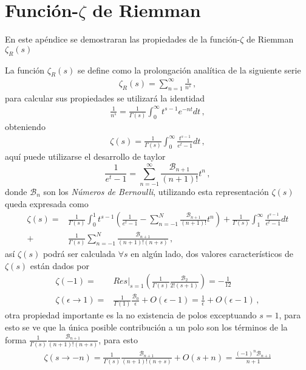 \chapter{Función-$\zeta$ de Riemman}\label{Apendice.2}

En este apéndice se demostraran las propiedades de la función-$\zeta$ de Riemman $\zeta _R (s)$

La función $\zeta _R (s)$ se define como la prolongación analítica de la siguiente serie
\begin{align}
	\zeta _R (s) = 
	\sum _{n=1} ^{\infty} \frac{1}{n ^{s}}
	\, ,
\end{align}
para calcular sus propiedades se utilizará la identidad
\begin{align}
	\frac{1}{n ^{s}} =
	\frac{1}{\Gamma (s)} 
	\int _0 ^{\infty} t^{s-1} e ^{-n t}  dt
	\, ,
\end{align}
obteniendo
\begin{align}
	\zeta (s) = 
	\frac{1}{\Gamma (s)}
	\int _0 ^\infty
	\frac{t ^{s-1}}{e ^t -1} dt
	\, ,
\end{align}
aquí puede utilizarse el desarrollo de taylor 
\begin{equation}
	\frac{1}{e ^t -1} = 
	\sum _{n=-1} ^{\infty}
	\frac{ \mathcal{B} _{n+1}}{(n+1)!} t ^n
	\, ,
\end{equation}
donde $\mathcal{B} _{n}$ son los {\it Números de Bernoulli}, utilizando esta representación $\zeta (s)$ queda expresada como
\begin{align}
	\zeta (s) = 
&
	\frac{1}{\Gamma (s)}
	\int _0 ^1 
	t ^{s-1} 
	\left(	
		\frac{1}{e ^t -1} -
		\sum _{n=-1} ^{N}
		\frac{ \mathcal{B} _{n+1}}{(n+1)!} t ^n	
		\right)		
		+
	\frac{1}{\Gamma (s)}
	\int _1 ^\infty
	\frac{t ^{s-1}}{e ^t -1} dt
\\
	+
&
	\frac{1}{\Gamma (s)}
	\sum _{n=-1} ^{N}
	\frac{ \mathcal{B} _{n+1}}{ (n+1)! (n + s)}
	\, ,
\end{align}
así $\zeta (s)$ podrá ser calculada $\forall s $ en algún lado, dos valores característicos de $\zeta(s)$ están dados por
\begin{align}
	\zeta (-1) = 
&
	Res \Big| _{s=1}
		\left(
			\frac{1}{\Gamma (s)} \frac{\mathcal{B} _2}{2! (s+1)}
			\right) =
	- \frac{1}{12}
\\
	\zeta (\epsilon \rightarrow 1) =
& 
	\frac{1}{\Gamma (1)} \frac{\mathcal{B} _0}{ \epsilon} + O (\epsilon -1 ) = 
	\frac{1}{ \epsilon} + O (\epsilon -1 ) 
	\, ,
\end{align}
otra propiedad importante es la no existencia de polos exceptuando $s=1$, para esto se ve que la única posible contribución a un polo son los términos de la forma  $	\frac{1}{\Gamma (s)} \frac{ \mathcal{B} _{n+1}}{ (n+1)! (n + s)}$, para esto 
\begin{align}
	\zeta ( s \rightarrow -n ) = 
	\frac{1}{\Gamma (s)}
	\frac{ \mathcal{B} _{n+1}}{ (n+1)! (n + s)}
	+ O (s + n) = 
	\frac{(-1) ^n \mathcal{B} _{n+1}}
		{n+1}
\end{align}






















